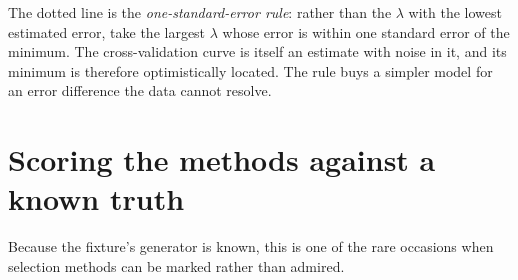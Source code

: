 \documentclass[
  letterpaper,
  10pt,
  twoside,
  openright,
  numbers=noenddot,
  chapterprefix=true]{scrbook}
\begin{document}
The dotted line is the \emph{one-standard-error rule}: rather than the
\(\lambda\) with the lowest estimated error, take the largest
\(\lambda\) whose error is within one standard error of the minimum. The
cross-validation curve is itself an estimate with noise in it, and its
minimum is therefore optimistically located. The rule buys a simpler
model for an error difference the data cannot resolve.

\section{Scoring the methods against a known
truth}\label{scoring-the-methods-against-a-known-truth}

Because the fixture's generator is known, this is one of the rare
occasions when selection methods can be marked rather than admired.
\end{document}
